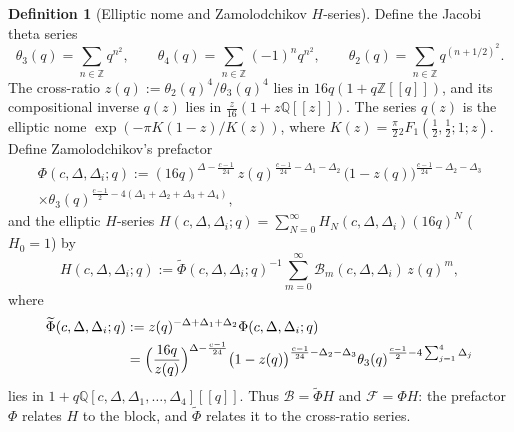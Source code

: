 \documentclass[twoside,10pt]{article}
\numberwithin{equation}{section}
\theoremstyle{slbody}
\theoremstyle{definition}
\newtheorem{definition}[theorem]{Definition}
\theoremstyle{remark}
\begin{document}
\begin{definition}[Elliptic nome and Zamolodchikov \(H\)-series]\label{def:H-series}
Define the Jacobi theta series
\[
 \theta_3(q)=\sum_{n\in\mathbb Z}q^{n^2},\qquad
 \theta_4(q)=\sum_{n\in\mathbb Z}(-1)^n q^{n^2},\qquad
 \theta_2(q)=\sum_{n\in\mathbb Z}q^{(n+1/2)^2}.
\]
The cross-ratio \(z(q):=\theta_2(q)^4/\theta_3(q)^4\) lies in
\(16q(1+q\mathbb Z[[q]])\), and its compositional inverse \(q(z)\) lies in
\(\frac{z}{16}(1+z\mathbb Q[[z]])\).  The series \(q(z)\) is the elliptic nome
\(\exp(-\pi K(1-z)/K(z))\), where
\(K(z)=\frac\pi2{}_2F_1(\tfrac12,\tfrac12;1;z)\).  Define Zamolodchikov's prefactor~\cite[\S3, the formula after (18)]{Zamolodchikov1987}
\begin{multline}\label{eq:Phi-def}
 \Phi(c,\Delta,\Delta_i;q)
 :=(16q)^{\Delta-\frac{c-1}{24}}\,
   z(q)^{\frac{c-1}{24}-\Delta_1-\Delta_2}\,
   \bigl(1-z(q)\bigr)^{\frac{c-1}{24}-\Delta_2-\Delta_3}\\
   \times\theta_3(q)^{\frac{c-1}{2}-4(\Delta_1+\Delta_2+\Delta_3+\Delta_4)},
\end{multline}
and the elliptic \(H\)-series
\(H(c,\Delta,\Delta_i;q)=\sum_{N=0}^\infty H_N(c,\Delta,\Delta_i)(16q)^N\)
(\(H_0=1\)) by
\begin{equation}\label{eq:H-def}
 H(c,\Delta,\Delta_i;q)
 :=\widetilde\Phi(c,\Delta,\Delta_i;q)^{-1}
   \sum_{m=0}^\infty\mathcal B_m(c,\Delta,\Delta_i)\,z(q)^m,
\end{equation}
where
\begin{align*}
 \widetilde\Phi(c,\Delta,\Delta_i;q)
 &:=z(q)^{-\Delta+\Delta_1+\Delta_2}\Phi(c,\Delta,\Delta_i;q)\\
 &=\Bigl(\frac{16q}{z(q)}\Bigr)^{\Delta-\frac{c-1}{24}}
  \bigl(1-z(q)\bigr)^{\frac{c-1}{24}-\Delta_2-\Delta_3}
  \theta_3(q)^{\frac{c-1}{2}-4\sum_{j=1}^4\Delta_j}
\end{align*}
lies in \(1+q\mathbb Q[c,\Delta,\Delta_1,\dots,\Delta_4][[q]]\).  Thus
\(\mathcal B=\widetilde\Phi H\) and \(\mathcal F=\Phi H\): the prefactor
\(\Phi\) relates \(H\) to the block, and \(\widetilde\Phi\) relates it to the
cross-ratio series.
\end{definition}
\end{document}
